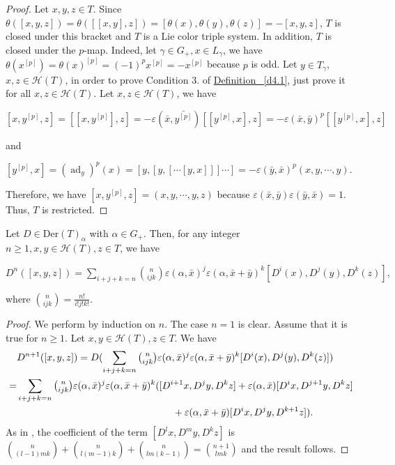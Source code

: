\documentclass[11pt, twoside]{article}
\DeclareMathOperator{\ad}{ad}
\begin{document}
\begin{proof}
Let $x,y,z\in T$.
   Since $\theta([x,y,z])=\theta([[x,y],z])=[\theta(x),\theta(y),\theta(z)] = -[x,y,z] $, $T$ is closed under this bracket and $T$ is a Lie color triple system. In addition, $T$ is closed under the $p$-map. Indeed, let $\gamma\in G_+,  x \in L_\gamma$, we have  $\theta(x^{[p]})=\theta(x)^{[p]}=(-1)^px^{[p]}=-x^{[p]} $ because $p$ is odd. Let $y\in T_\gamma$, $x,z\in \mathcal{H}(T)$, in order to prove Condition $3. $ of  \hyperref[d4.1]{Definition ~\ref*{d4.1}}, just prove it for all $x,z\in \mathcal{H}(T)$. Let $x,z\in \mathcal{H}(T) $, we have \begin{center}
        $[x,y^{[p]},z]=[[x,y^{[p]}],z]=-\varepsilon(\bar{x},\bar{y^{[p]}})[[y^{[p]},x],z]= -\varepsilon(\bar{x},\bar{y})^p[[y^{[p]},x],z] $
    \end{center} and \begin{center}
        $[y^{[p]},x]=(\ad_y)^p(x)= [y,[y,[\cdots[y,x]]]\cdots]= -\varepsilon(\bar{y},\bar{x})^p(x,y,\cdots,y) $.
    \end{center} Therefore, we have $[x,y^{[p]},z]= (x,y,\cdots,y,z) $ because $\varepsilon(\bar{x},\bar{y})\varepsilon(\bar{y},\bar{x})=1 $. Thus, $T$ is restricted.
\end{proof}

\begin{lem}
Let $D\in \mathrm{Der}(T)_{\alpha}$ with $\alpha\in G_+ $. Then, for any integer $n\geq 1, x,y\in \mathcal{H}(T), z\in T$, we have \begin{center}
        $D^n([x,y,z])= \sum\limits_{i+j+k=n} \binom{n}{ijk}\varepsilon(\alpha,\bar{x})^j\varepsilon(\alpha,\bar{x}+\bar{y})^k[D^i(x),D^j(y),D^k(z)], $
    \end{center} where $\binom{n}{ijk}= \frac{n!}{i!j!k!} $.
\end{lem}

\begin{proof}
   We perform by induction on $n$. The case $n=1$ is clear. Assume that it is true for $n\geq 1$. Let $x,y\in \mathcal{H}(T),z\in T $. We have \begin{align*}
       & D^{n+1}([x,y,z]) = D( \sum\limits_{i+j+k=n} \tbinom{n}{ijk}\varepsilon(\alpha,\bar{x})^j\varepsilon(\alpha,\bar{x}+\bar{y})^k[D^i(x),D^j(y),D^k(z)]) \\ =& \sum\limits_{i+j+k=n} \tbinom{n}{ijk}\varepsilon(\alpha,\bar{x})^j\varepsilon(\alpha,\bar{x}+\bar{y})^k([D^{i+1}x,D^jy,D^kz] +\varepsilon(\alpha,\bar{x})[D^ix,D^{j+1}y,D^kz] \\ & \quad \quad\quad\quad\quad\quad\quad\quad\quad\quad\quad\quad\quad\quad\quad\quad+ \varepsilon(\alpha,\bar{x}+\bar{y})[D^ix,D^jy,D^{k+1}z]).
    \end{align*} As in \cite{H01}, the coefficient of the term $[D^lx,D^my, D^kz ] $  is $\binom{n}{(l-1)mk}+ \binom{n}{l(m-1)k}+ \binom{n}{lm(k-1)} = \binom{n+1}{lmk}$ and the result follows.
\end{proof}
\end{document}
